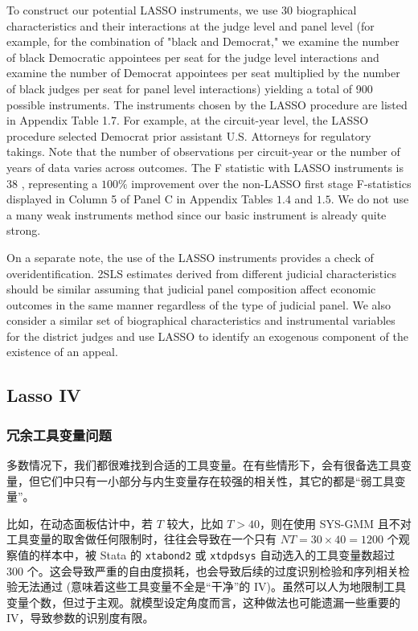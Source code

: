 {%
To construct our potential LASSO instruments, we use 30 biographical characteristics and their interactions at the judge level and panel level (for example, for the combination of "black and Democrat," we examine the number of black Democratic appointees per seat for the judge level interactions and examine the number of Democrat appointees per seat multiplied by the number of black judges per seat for panel level interactions) yielding a total of 900 possible instruments. The instruments chosen by the LASSO procedure are listed in Appendix Table 1.7. For example, at the circuit-year level, the LASSO procedure selected Democrat prior assistant U.S. Attorneys for regulatory takings. Note that the number of observations per circuit-year or the number of years of data varies across outcomes. The F statistic with LASSO instruments is 38 , representing a $100 \%$ improvement over the non-LASSO first stage F-statistics displayed in Column 5 of Panel $\mathrm{C}$ in Appendix Tables $1.4$ and $1.5$. We do not use a many weak instruments method since our basic instrument is already quite strong.

On a separate note, the use of the LASSO instruments provides a check of overidentification. 2SLS estimates derived from different judicial characteristics should be similar assuming that judicial panel composition affect economic outcomes in the same manner regardless of the type of judicial panel. We also consider a similar set of biographical characteristics and instrumental variables for the district judges and use LASSO to identify an exogenous component of the existence of an appeal.

\fi      %


\subsection{Lasso IV}\label{sec:lasso-IV}

\subsubsection{冗余工具变量问题}
多数情况下，我们都很难找到合适的工具变量。在有些情形下，会有很备选工具变量，但它们中只有一小部分与内生变量存在较强的相关性，其它的都是“弱工具变量”。

比如，在动态面板估计中，若 $T$ 较大，比如 $T>40$，则在使用 SYS-GMM 且不对工具变量的取舍做任何限制时，往往会导致在一个只有 $NT=30 \times 40 = 1200$ 个观察值的样本中，被 Stata 的 \texttt{xtabond2} 或 \texttt{xtdpdsys} 自动选入的工具变量数超过 300 个。这会导致严重的自由度损耗，也会导致后续的过度识别检验和序列相关检验无法通过 (意味着这些工具变量不全是“干净”的 IV)。虽然可以人为地限制工具变量个数，但过于主观。就模型设定角度而言，这种做法也可能遗漏一些重要的 IV，导致参数的识别度有限。

}
